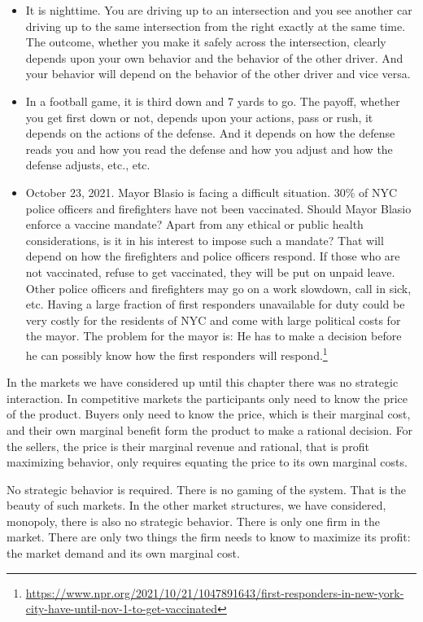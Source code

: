 \documentclass[
]{book}
\providecommand{\tightlist}{%
  \setlength{\itemsep}{0pt}\setlength{\parskip}{0pt}}
\begin{document}
\begin{itemize}
\tightlist
\item
  It is nighttime. You are driving up to an intersection and you see another car driving up to the same intersection from the right exactly at the same time. The outcome, whether you make it safely across the intersection, clearly depends upon your own behavior and the behavior of the other driver. And your behavior will depend on the behavior of the other driver and vice versa.
\item
  In a football game, it is third down and 7 yards to go. The payoff, whether you get first down or not, depends upon your actions, pass or rush, it depends on the actions of the defense. And it depends on how the defense reads you and how you read the defense and how you adjust and how the defense adjusts, etc., etc.
\item
  October 23, 2021. Mayor Blasio is facing a difficult situation. 30\% of NYC police officers and firefighters have not been vaccinated. Should Mayor Blasio enforce a vaccine mandate? Apart from any ethical or public health considerations, is it in his interest to impose such a mandate? That will depend on how the firefighters and police officers respond. If those who are not vaccinated, refuse to get vaccinated, they will be put on unpaid leave. Other police officers and firefighters may go on a work slowdown, call in sick, etc. Having a large fraction of first responders unavailable for duty could be very costly for the residents of NYC and come with large political costs for the mayor. The problem for the mayor is: He has to make a decision before he can possibly know how the first responders will respond.\footnote{\url{https://www.npr.org/2021/10/21/1047891643/first-responders-in-new-york-city-have-until-nov-1-to-get-vaccinated}}
\end{itemize}

In the markets we have considered up until this chapter there was no strategic interaction. In competitive markets the participants only need to know the price of the product. Buyers only need to know the price, which is their marginal cost, and their own marginal benefit form the product to make a rational decision. For the sellers, the price is their marginal revenue and rational, that is profit maximizing behavior, only requires equating the price to its own marginal costs.

No strategic behavior is required. There is no gaming of the system. That is the beauty of such markets.
In the other market structures, we have considered, monopoly, there is also no strategic behavior. There is only one firm in the market. There are only two things the firm needs to know to maximize its profit: the market demand and its own marginal cost.
\end{document}
